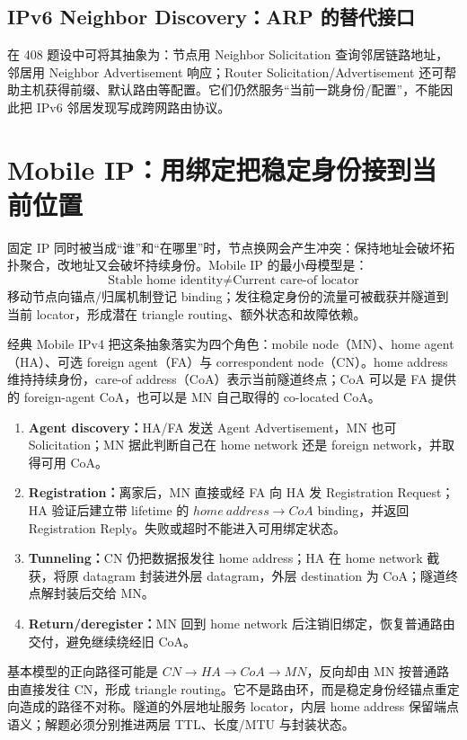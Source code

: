 \documentclass[11pt,a4paper]{ctexart}
\newcommand{\kw}[1]{\textbf{\color{deep}#1}}
\begin{document}
\subsection{IPv6 Neighbor Discovery：ARP 的替代接口}

在 408 题设中可将其抽象为：节点用 Neighbor Solicitation 查询邻居链路地址，邻居用 Neighbor Advertisement 响应；Router Solicitation/Advertisement 还可帮助主机获得前缀、默认路由等配置。它们仍然服务“当前一跳身份/配置”，不能因此把 IPv6 邻居发现写成跨网路由协议。

\section{Mobile IP：用绑定把稳定身份接到当前位置}

固定 IP 同时被当成“谁”和“在哪里”时，节点换网会产生冲突：保持地址会破坏拓扑聚合，改地址又会破坏持续身份。Mobile IP 的最小母模型是：
\[
\boxed{\text{Stable home identity}\ne\text{Current care-of locator}}
\]
移动节点向锚点/归属机制登记 binding；发往稳定身份的流量可被截获并隧道到当前 locator，形成潜在 triangle routing、额外状态和故障依赖。

经典 Mobile IPv4 把这条抽象落实为四个角色：mobile node（MN）、home agent（HA）、可选 foreign agent（FA）与 correspondent node（CN）。home address 维持持续身份，care-of address（CoA）表示当前隧道终点；CoA 可以是 FA 提供的 foreign-agent CoA，也可以是 MN 自己取得的 co-located CoA。

\begin{enumerate}
  \item \kw{Agent discovery：}HA/FA 发送 Agent Advertisement，MN 也可 Solicitation；MN 据此判断自己在 home network 还是 foreign network，并取得可用 CoA。
  \item \kw{Registration：}离家后，MN 直接或经 FA 向 HA 发 Registration Request；HA 验证后建立带 lifetime 的 $home\ address\to CoA$ binding，并返回 Registration Reply。失败或超时不能进入可用绑定状态。
  \item \kw{Tunneling：}CN 仍把数据报发往 home address；HA 在 home network 截获，将原 datagram 封装进外层 datagram，外层 destination 为 CoA；隧道终点解封装后交给 MN。
  \item \kw{Return/deregister：}MN 回到 home network 后注销旧绑定，恢复普通路由交付，避免继续绕经旧 CoA。
\end{enumerate}

基本模型的正向路径可能是 $CN\to HA\to CoA\to MN$，反向却由 MN 按普通路由直接发往 CN，形成 triangle routing。它不是路由环，而是稳定身份经锚点重定向造成的路径不对称。隧道的外层地址服务 locator，内层 home address 保留端点语义；解题必须分别推进两层 TTL、长度/MTU 与封装状态。
\end{document}
